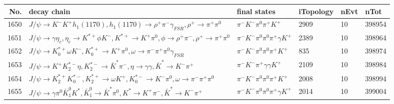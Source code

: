 \begin{table}[htbp] 
\begin{center}
\begin{small}
\begin{tabular}{rlllll}\hline\hline
 No. & decay chain & final states &  iTopology & nEvt & nTot \\\hline
1650&$J/\psi       \rightarrow K^{-}          K^{+}          h_{1}(1170)    , h_{1}(1170)     \rightarrow \rho^{+}      \pi^{-}        \gamma_{FSR} , \rho^{+}       \rightarrow \pi^{+}        \pi^{0}        $&$\pi^{-}        K^{-}          \pi^{0}        \pi^{+}        K^{+}          $& 2909&   10&398954\\
1651&$J/\psi       \rightarrow \gamma       \eta_{c}    , \eta_{c}     \rightarrow K^{*+}         \phi           K^{-}          , K^{*+}          \rightarrow K^{+}          \pi^{0}        , \phi            \rightarrow \rho^{+}      \pi^{-}        , \rho^{+}       \rightarrow \pi^{+}        \pi^{0}        $&$\pi^{-}        K^{-}          \pi^{0}        \pi^{0}        \pi^{+}        \gamma       K^{+}          $& 2389&   10&398964\\
1652&$J/\psi       \rightarrow K_{0}^{*+}     \omega         K^{-}          , K_{0}^{*+}      \rightarrow K^{+}          \pi^{0}        , \omega          \rightarrow \pi^{-}        \pi^{+}        \pi^{0}        \gamma_{FSR} $&$\pi^{-}        K^{-}          \pi^{0}        \pi^{0}        \pi^{+}        K^{+}          $&  835&   10&398974\\
1653&$J/\psi       \rightarrow K^{+}          K_2^{*-}       \eta          , K_2^{*-}        \rightarrow \bar{K}^{*}   \pi^{-}        , \eta           \rightarrow \gamma       \gamma       , \bar{K}^{*}    \rightarrow K^{-}          \pi^{+}        $&$\pi^{-}        K^{-}          \pi^{+}        \gamma       \gamma       K^{+}          $& 2109&   10&398984\\
1654&$J/\psi       \rightarrow K_2^{*+}       K_{0}^{*-}     , K_2^{*+}        \rightarrow \omega         K^{+}          , K_{0}^{*-}      \rightarrow K^{-}          \pi^{0}        , \omega          \rightarrow \pi^{-}        \pi^{+}        \pi^{0}        $&$\pi^{-}        K^{-}          \pi^{0}        \pi^{0}        \pi^{+}        K^{+}          $& 2008&   10&398994\\
1655&$J/\psi       \rightarrow \gamma       \pi^{0}        \bar{K}_1^{0} K^{*}          , \bar{K}_1^{0}  \rightarrow \bar{K}^{*}   \pi^{0}        , K^{*}           \rightarrow K^{+}          \pi^{-}        , \bar{K}^{*}    \rightarrow K^{-}          \pi^{+}        $&$\pi^{-}        K^{-}          \pi^{0}        \pi^{0}        \pi^{+}        \gamma       K^{+}          $& 2014&   10&399004\\

\end{tabular}
\end{small}
\end{center}
\end{table}
